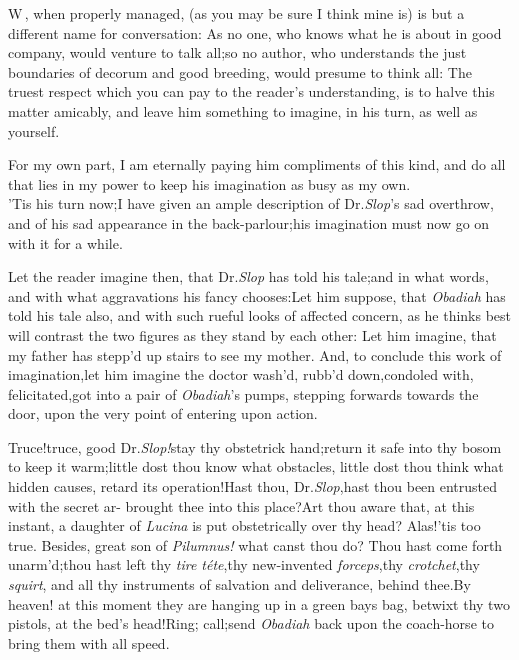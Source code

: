 \documentclass{article}
\begin{document}
\lettrine{W}{\,}, when properly managed, (as
you may be sure I think mine is) is but a different name for
conversation: As no one, who knows what he is about in good
company, would venture to talk all;\tsk so no author, who
understands the just boundaries of decorum and good breeding, would
presume to think all: The truest respect which you can pay to the
reader’s understanding, is to halve this matter amicably, and
leave him something to imagine, in his turn,\break
as well as yourself.

For my own part, I am eternally paying him compliments of this
kind, and do all that lies in my power to keep his\break
imagination as busy as my own.\\
\newpage
’Tis his turn now;\tsk I have given an ample description of Dr.\@ \textit{Slop}’s sad
overthrow, and of his sad appearance in the back-parlour;\tsk his
imagination must now go on with it for a while.

Let the reader imagine then, that Dr.\@ \textit{Slop} has told his
tale;\tsk and in what words, and with what aggravations his fancy
chooses:\tsk Let him suppose, that \textit{Obadiah} has told his
tale also, and with such rueful looks of affected concern, as he
thinks best will contrast the two\break
figures as they stand by each other:\tsk\break
Let him imagine, that my father has\break
stepp’d up stairs to see my mother.\tsk\break 
And, to conclude this work of imagination,\tsk let him
imagine the doctor wash’d,\break
\tsk rubb’d down,\tsk condoled with,\tsk\break
felicitated,\tsk got into a pair of \textit{Obadiah}’s\break
pumps, stepping forwards towards the
door, upon the very point of entering\break
upon action.

Truce!\tsk truce, good Dr.\@ \textit{Slop!}\tsk stay thy
obstetrick hand;\tsk return it safe into thy bosom to keep
it warm;\tsk little dost thou know what obstacles,\tsk
little dost thou think what hidden causes, retard its
operation!\tsk Hast thou, Dr.\@ \textit{Slop},\tsk hast thou
been entrusted with the secret ar-\break
{} 
brought thee into this place?\tsk Art thou aware
that, at this instant, a daughter of \textit{Lucina} is put
obstetrically over thy head?\break
Alas!\tsk ’tis too true.\tsk
Besides, great son of \textit{Pilumnus!} what canst thou
do?\tsh\break
Thou hast come forth unarm’d;\tsk thou hast left thy
\textit{tire téte},\tsk thy new-invented
\textit{forceps},\tsk thy \textit{crotchet},\tsk thy
\textit{squirt}, and all thy instruments of salvation and
deliverance, behind thee.\tsk By heaven!
at this moment they are hanging up in a green bays bag,
betwixt thy two pistols, at the bed’s head!\tsk Ring;\tsk
call;\tsk send \textit{Obadiah} back upon the coach-horse to
bring them with all speed.
\end{document}
